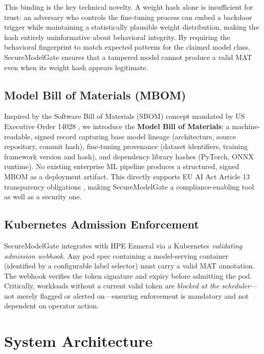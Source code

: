 \documentclass[10pt,twocolumn]{article}
\begin{document}
This binding is the key technical novelty. A weight hash alone is insufficient
for trust: an adversary who controls the fine-tuning process can embed a
backdoor trigger while maintaining a statistically plausible weight
distribution, making the hash entirely uninformative about behavioral integrity.
By requiring the behavioral fingerprint to match expected patterns for the
claimed model class, SecureModelGate ensures that a tampered model cannot
produce a valid MAT even when its weight hash appears legitimate.

\subsection{Model Bill of Materials (MBOM)}

Inspired by the Software Bill of Materials (SBOM) concept mandated by US
Executive Order 14028 \cite{eo14028}, we introduce the
\textbf{Model Bill of Materials}: a machine-readable, signed record capturing
base model lineage (architecture, source repository, commit hash), fine-tuning
provenance (dataset identifiers, training framework version and hash), and
dependency library hashes (PyTorch, ONNX runtime). No existing enterprise ML
pipeline produces a structured, signed MBOM as a deployment artifact.
This directly supports EU AI Act Article 13 transparency obligations
\cite{euaiact}, making SecureModelGate a compliance-enabling tool as well as
a security one.

\subsection{Kubernetes Admission Enforcement}

SecureModelGate integrates with HPE Ezmeral via a Kubernetes
\emph{validating admission webhook}. Any pod spec containing a model-serving
container (identified by a configurable label selector) must carry a valid MAT
annotation. The webhook verifies the token signature and expiry before
admitting the pod. Critically, workloads without a current valid token are
\emph{blocked at the scheduler}---not merely flagged or alerted on---ensuring
enforcement is mandatory and not dependent on operator action.

\section{System Architecture}
\end{document}
